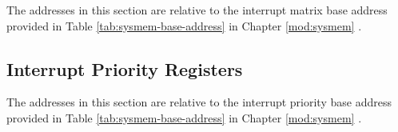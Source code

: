 \documentclass[main\_\_EN.tex]{subfiles}
\begin{document}
The addresses in this section are relative to  the interrupt matrix base address provided in Table \ref{tab:sysmem-base-address} in Chapter \ref{mod:sysmem} \textit{}.



\subsection{Interrupt Priority Registers}
\label{sec:intpri-reg}

The addresses in this section are relative to  the interrupt priority base address provided in Table \ref{tab:sysmem-base-address} in Chapter \ref{mod:sysmem} \textit{}.


\end{document}
